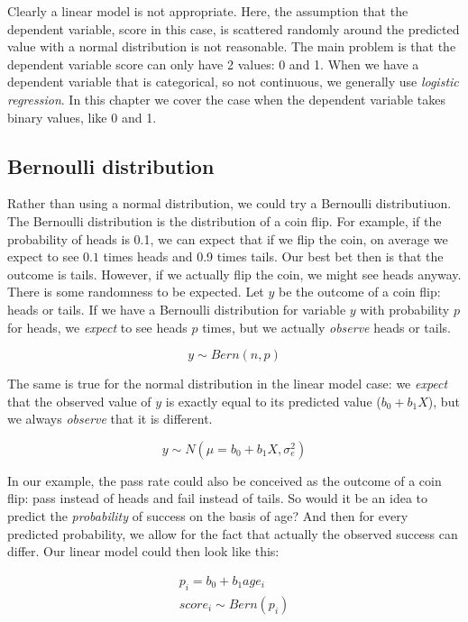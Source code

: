\documentclass[]{book}\usepackage[]{graphicx}\usepackage[]{color}
\begin{document}
Clearly a linear model is not appropriate. Here, the assumption that the dependent variable, score in this case, is scattered randomly around the predicted value with a normal distribution is not reasonable. The main problem is that the dependent variable score can only have 2 values: 0 and 1. When we have a dependent variable that is categorical, so not continuous, we generally use \textit{logistic regression}. In this chapter we cover the case when the dependent variable takes binary values, like 0 and 1.


\subsection{Bernoulli distribution}

Rather than using a normal distribution, we could try a Bernoulli distributiuon. The Bernoulli distribution is the distribution of a coin flip. For example, if the probability of heads is 0.1, we can expect that if we flip the coin, on average we expect to see $0.1$ times heads and 0.9 times tails. Our best bet then is that the outcome is tails. However, if we actually flip the coin, we might see heads anyway. There is some randomness to be expected. Let $y$ be the outcome of a coin flip: heads or tails. If we have a Bernoulli distribution for variable $y$ with probability $p$ for heads, we \textit{expect} to see heads $p$ times, but we actually \textit{observe} heads or tails.

\begin{equation}
y \sim Bern(n, p)
\end{equation}

The same is true for the normal distribution in the linear model case: we \textit{expect} that the observed value of $y$ is exactly equal to its predicted value ($b_0 + b_1 X$), but we always \textit{observe} that it is different.

\begin{equation}
y \sim N(\mu= b_0 + b_1 X, \sigma^2_e)
\end{equation}

In our example, the pass rate could also be conceived as the outcome of a coin flip: pass instead of heads and fail instead of tails. So would it be an idea to predict the \textit{probability} of success on the basis of age? And then for every predicted probability, we allow for the fact that actually the observed success can differ. Our linear model could then look like this:


\begin{eqnarray}
p_i = b_0 + b_1 age_i \\
score_i \sim Bern(p_i)
\end{eqnarray}
\end{document}
